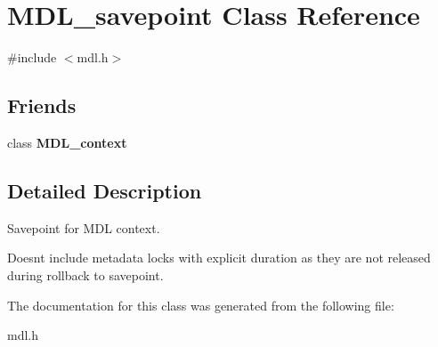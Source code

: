 \hypertarget{classMDL__savepoint}{}\section{M\+D\+L\+\_\+savepoint Class Reference}
\label{classMDL__savepoint}


{\ttfamily \#include $<$mdl.\+h$>$}

\subsection*{Friends}
\begin{DoxyCompactItemize}
\item 
\mbox{\label{classMDL__savepoint_aab25f1f33d2f55eb5c79f0f7b6bfaecd}} 
class {\bfseries M\+D\+L\+\_\+context}
\end{DoxyCompactItemize}


\subsection{Detailed Description}
Savepoint for M\+DL context.

Doesn\textquotesingle{}t include metadata locks with explicit duration as they are not released during rollback to savepoint. 

The documentation for this class was generated from the following file\+:\begin{DoxyCompactItemize}
\item 
mdl.\+h\end{DoxyCompactItemize}
